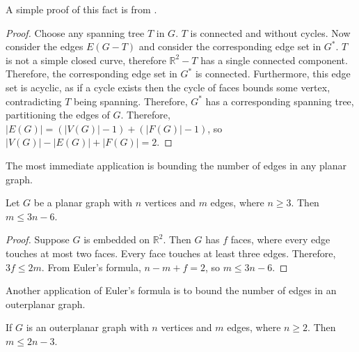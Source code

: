 A simple proof of this fact is from \textcite{staudtGeometrieLage1847}.

\begin{proof}
	Choose any spanning tree $T$ in $G$. $T$ is connected and without cycles. Now consider the edges $E(G - T)$ and consider the corresponding edge set in $G^*$. $T$ is not a simple closed curve, therefore $\mathbb{R}^2 - T$ has a single connected component. Therefore, the corresponding edge set in $G^*$ is connected. Furthermore, this edge set is acyclic, as if a cycle exists then the cycle of faces bounds some vertex, contradicting $T$ being spanning. Therefore, $G^*$ has a corresponding spanning tree, partitioning the edges of $G$. Therefore, $|E(G)| = (|V(G)| - 1) + (|F(G)| - 1)$, so $|V(G)| - |E(G)| + |F(G)| = 2$. 
\end{proof}

The most immediate application is bounding the number of edges in any planar graph.
\begin{proposition}\label{thm:planar_graph_edge_bound}
	Let $G$ be a planar graph with $n$ vertices and $m$ edges, where $n \geq 3$. Then $m \leq 3n - 6$.
\end{proposition}
\begin{proof}
	Suppose $G$ is embedded on $\mathbb{R}^2$. Then $G$ has $f$ faces, where every edge touches at most two faces. Every face touches at least three edges. Therefore, $3f \leq 2m$. From Euler's formula, $n - m + f = 2$, so $m \leq 3n - 6$. 
\end{proof}

Another application of Euler's formula is to bound the number of edges in an outerplanar graph.
\begin{proposition}\label{thm:outerplanar_bound}
	If \(G\) is an outerplanar graph with \(n\) vertices and \(m\) edges, where $n \geq 2$. Then \(m \leq 2n - 3\).
\end{proposition}

